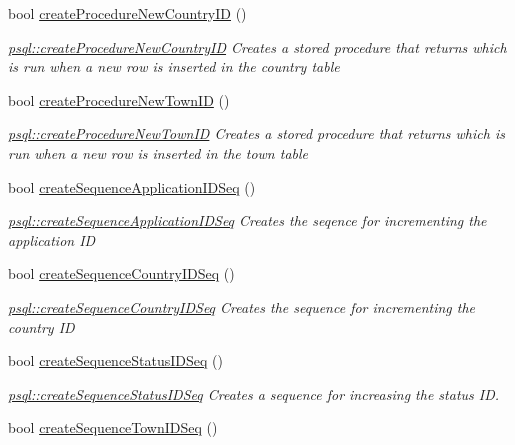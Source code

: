 \begin{DoxyCompactItemize}
bool \mbox{\hyperlink{classpsql_a565bfc828ecb6b5621354128773494fd}{create\+Procedure\+New\+Country\+ID}} ()
\begin{DoxyCompactList}\small\item\em \mbox{\hyperlink{classpsql_a565bfc828ecb6b5621354128773494fd}{psql\+::create\+Procedure\+New\+Country\+ID}} Creates a stored procedure that returns which is run when a new row is inserted in the country table \end{DoxyCompactList}\item 
bool \mbox{\hyperlink{classpsql_ade0c7fa4f019c3f349230af09b1de49e}{create\+Procedure\+New\+Town\+ID}} ()
\begin{DoxyCompactList}\small\item\em \mbox{\hyperlink{classpsql_ade0c7fa4f019c3f349230af09b1de49e}{psql\+::create\+Procedure\+New\+Town\+ID}} Creates a stored procedure that returns which is run when a new row is inserted in the town table \end{DoxyCompactList}\item 
bool \mbox{\hyperlink{classpsql_a54c75d0896ee6aad58e22c830895c106}{create\+Sequence\+Application\+I\+D\+Seq}} ()
\begin{DoxyCompactList}\small\item\em \mbox{\hyperlink{classpsql_a54c75d0896ee6aad58e22c830895c106}{psql\+::create\+Sequence\+Application\+I\+D\+Seq}} Creates the seqence for incrementing the application ID \end{DoxyCompactList}\item 
bool \mbox{\hyperlink{classpsql_aa907c84f592212451d3d59a2061adabd}{create\+Sequence\+Country\+I\+D\+Seq}} ()
\begin{DoxyCompactList}\small\item\em \mbox{\hyperlink{classpsql_aa907c84f592212451d3d59a2061adabd}{psql\+::create\+Sequence\+Country\+I\+D\+Seq}} Creates the sequence for incrementing the country ID \end{DoxyCompactList}\item 
bool \mbox{\hyperlink{classpsql_ae882aa80b2d629383fc2e60aecfd421a}{create\+Sequence\+Status\+I\+D\+Seq}} ()
\begin{DoxyCompactList}\small\item\em \mbox{\hyperlink{classpsql_ae882aa80b2d629383fc2e60aecfd421a}{psql\+::create\+Sequence\+Status\+I\+D\+Seq}} Creates a sequence for increasing the status ID. \end{DoxyCompactList}\item 
bool \mbox{\hyperlink{classpsql_a6ce21cb5a1e77cb0c280e2932d2b557d}{create\+Sequence\+Town\+I\+D\+Seq}} ()

\end{DoxyCompactItemize}
